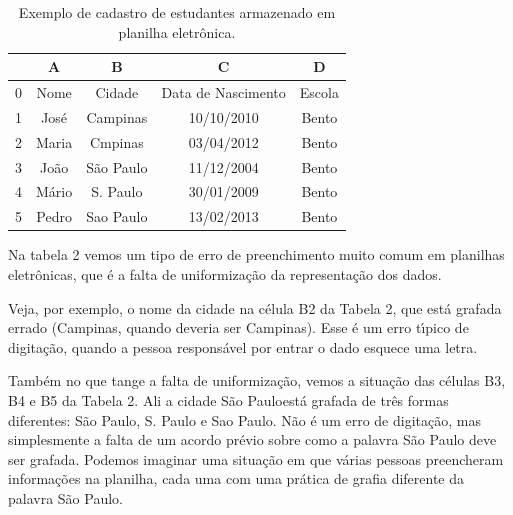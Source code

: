 \documentclass[
12pt,		%
openright,	%
twoside,  %
a4paper,			%
chapter=TITLE,		%
english,			%
french,				%
spanish,			%
brazil				%
]{USPSC-classe/USPSC}
\begin{document}
\begin{table}[htb]
\tiny
\caption{\label{ddd7a335bbc10f88eaaf4abda266d151f0ba0e6f}Exemplo de cadastro de estudantes armazenado em planilha eletr\^onica.}

\centering
\begin{tabular}{|c|c|c|c|c|}
\hline
  &  A  &  B  &  C  &  D  \\
\hline
0 & Nome  &  Cidade  &  Data de Nascimento  &  Escola \\
1 & Jos\'e  &  Campinas  &  10/10/2010  &  Bento \\
2 & Maria  &  Cmpinas  &  03/04/2012  &  Bento \\
3 & Jo\~ao  &  S\~ao Paulo  &  11/12/2004  &  Bento \\
4 & M\'ario  &  S. Paulo  &  30/01/2009  &  Bento \\
5 & Pedro  &  Sao Paulo  &  13/02/2013  &  Bento \\
\hline
\end{tabular}
\end{table}


Na tabela 2 vemos um tipo de erro de preenchimento muito comum em planilhas eletr\^onicas, que \'e a falta de uniformiza\c{c}\~ao da representa\c{c}\~ao dos dados.

















Veja, por exemplo, o nome da cidade na c\'elula B2 da Tabela 2, que est\'a grafada errado (Campinas, quando deveria ser Campinas). Esse \'e um erro t\'{\i}pico de digita\c{c}\~ao, quando a pessoa respons\'avel por entrar o dado esquece uma letra.

















Tamb\'em no que tange a falta de uniformiza\c{c}\~ao, vemos a situa\c{c}\~ao das c\'elulas B3, B4 e B5 da Tabela 2. Ali a cidade \textquotedbl S\~ao Paulo\textquotedbl  est\'a grafada de tr\^es formas diferentes: S\~ao Paulo, S. Paulo e Sao Paulo. N\~ao \'e um erro de digita\c{c}\~ao, mas simplesmente a falta de um acordo pr\'evio sobre como a palavra S\~ao Paulo deve ser grafada. Podemos imaginar uma situa\c{c}\~ao em que v\'arias pessoas preencheram informa\c{c}\~oes na planilha, cada uma com uma pr\'atica de grafia diferente da palavra S\~ao Paulo.
\end{document}
